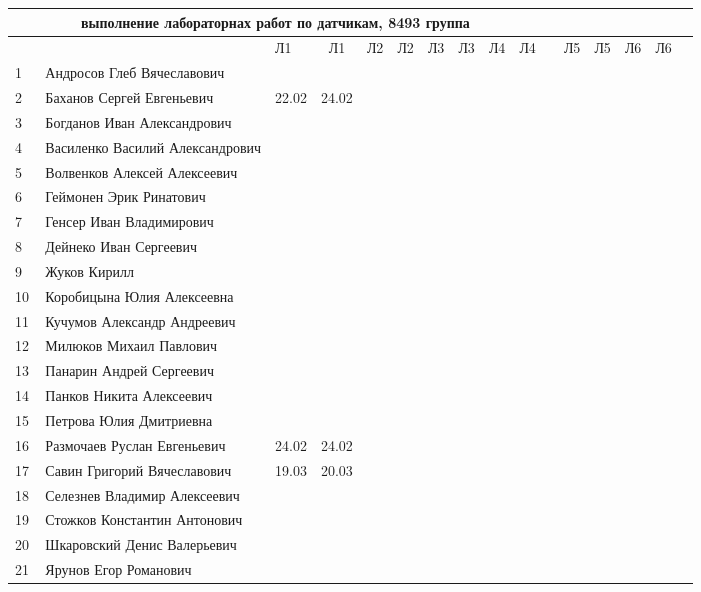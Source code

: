 \documentclass[a4paper,landscape,11pt]{article}
\begin{document}
\newpage
%
\begin{tabular}{l|llccccccccccccc}
\multicolumn{10}{c}{выполнение лабораторнах работ по датчикам, 8493 группа} \\
\toprule
&&Л1&Л1& Л2&Л2& Л3&Л3& Л4&Л4& &Л5&Л5& Л6&Л6\\
\midrule
1\,&  Андросов Глеб Вячеславович      &      &      &&&&&&\\
2\,&  Баханов Сергей Евгеньевич       & 22.02& 24.02&&&&&&\\
3\,&  Богданов Иван Александрович     &      &      &&&&&&\\
4\,&  Василенко Василий Александрович &      &      &&&&&&\\
5\,&  Волвенков Алексей Алексеевич    &      &      &&&&&&\\
\midrule                                            
6\,&  Геймонен Эрик Ринатович         &      &      &&&&&&\\
7\,&  Генсер Иван Владимирович        &      &      &&&&&&\\
8\,&  Дейнеко Иван Сергеевич          &      &      &&&&&&\\
9\,&  Жуков Кирилл                    &      &      &&&&&&\\
10\,& Коробицына Юлия Алексеевна      &      &      &&&&&&\\
\midrule                                            
11\,& Кучумов Александр Андреевич     &      &      &&&&&&\\
12\,& Милюков Михаил Павлович         &      &      &&&&&&\\
13\,& Панарин Андрей Сергеевич        &      &      &&&&&&\\
14\,& Панков Никита Алексеевич        &      &      &&&&&&\\
15\,& Петрова Юлия Дмитриевна         &      &      &&&&&&\\
\midrule                                            
16\,& Размочаев Руслан Евгеньевич     & 24.02& 24.02&&&&&&\\
17\,& Савин Григорий Вячеславович     & 19.03& 20.03&&&&&&\\
18\,& Селезнев Владимир Алексеевич    &      &      &&&&&&\\
19\,& Стожков Константин Антонович    &      &      &&&&&&\\
20\,& Шкаровский Денис Валерьевич     &      &      &&&&&&\\
\midrule                                            
21\,& Ярунов Егор Романович           &      &      &&&&&&\\
\bottomrule
\end{tabular}
\end{document}
